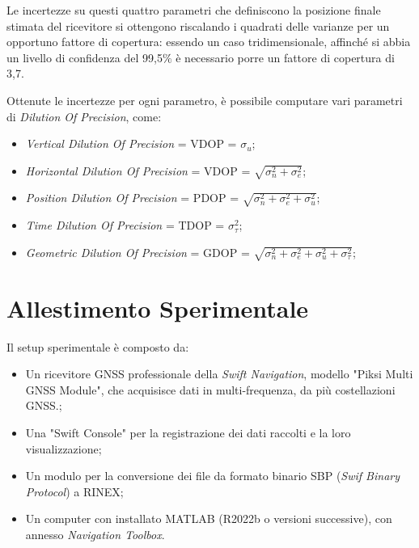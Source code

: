 \documentclass[a4paper,11pt,twoside]{book}
\begin{document}
	Le incertezze su questi quattro parametri che definiscono la posizione finale stimata del ricevitore si ottengono riscalando i quadrati delle varianze per un opportuno fattore di copertura: essendo un caso tridimensionale, affinché si abbia un livello di confidenza del 99,5$\%$ è necessario porre un fattore di copertura di 3,7.
	
	Ottenute le incertezze per ogni parametro, è possibile computare vari parametri di \textit{Dilution Of Precision}, come:
	
	\begin{itemize}[-]
		\item \textit{Vertical Dilution Of Precision} = VDOP = $\sigma_u$;
		
		\item \textit{Horizontal Dilution Of Precision} = VDOP = $\sqrt{\sigma_n^2 + \sigma_e^2}$;
		
		\item \textit{Position Dilution Of Precision} = PDOP = $\sqrt{\sigma_n^2 + \sigma_e^2 + \sigma_u^2}$;
		
		\item \textit{Time Dilution Of Precision} = TDOP = $\sigma_{\tau}^2$;
		
		\item \textit{Geometric Dilution Of Precision} = GDOP = $\sqrt{\sigma_n^2 + \sigma_e^2 + \sigma_u^2 + \sigma_{\tau}^2}$;
		
	\end{itemize}
	
	\section{Allestimento Sperimentale}
	
	Il setup sperimentale è composto da:
	
	\begin{itemize}[-]
		\item Un ricevitore GNSS professionale della \textit{Swift Navigation}, modello "Piksi Multi GNSS Module", che acquisisce dati in multi-frequenza, da più costellazioni GNSS.;
		
		\item Una "Swift Console" per la registrazione dei dati raccolti e la loro visualizzazione;
		
		\item Un modulo per la conversione dei file da formato binario SBP (\textit{Swif Binary Protocol}) a RINEX;
		
		\item Un computer con installato MATLAB (R2022b o versioni successive), con annesso \textit{Navigation Toolbox}.
		
		\end{itemize}
	
\end{document}
